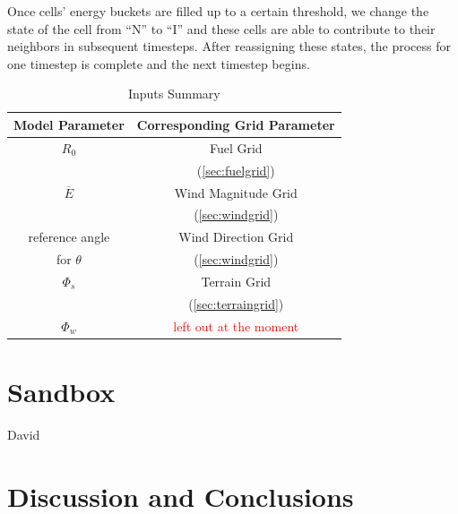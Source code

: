 \documentclass{article}
\newcommand{\note}[1]{\textcolor{red}{#1}}
\begin{document}
Once cells' energy buckets are filled up to a certain threshold, we change the state of the cell from ``N'' to ``I'' and these cells are able to contribute to their neighbors in subsequent timesteps. After reassigning these states, the process for one timestep is complete and the next timestep begins. 



\begin{table}[h]
\caption{Inputs Summary\label{tab:inputsummary}}
\centering
\begin{tabular}{ |c|c| } 

 \hline
 Model Parameter & Corresponding Grid Parameter \\ 
 \hline
 $R_0$ &  Fuel Grid \\ 
 		         &(\ref{sec:fuelgrid}) \\
 \hline
 $\overline{E}$ &  Wind Magnitude Grid \\ 
 				                     & (\ref{sec:windgrid}) \\
 \hline
 reference angle & Wind Direction Grid \\
 for $\theta$   & (\ref{sec:windgrid}) \\
 \hline
 $\Phi_s$ & Terrain Grid \\
                & (\ref{sec:terraingrid}) \\
  \hline
  $\Phi_w$ & \note{left out at the moment} \\
  \hline
                
  
\end{tabular}


\end{table}

\section{Sandbox}
David
\section{Discussion and Conclusions}
\end{document}
